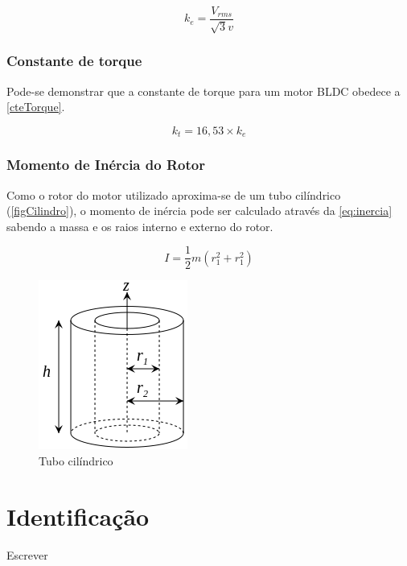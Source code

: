 \documentclass[
	12pt,				%
	openright,			%
	oneside,			%
	a4paper,			%
	english,			%
	french,				%
	spanish,			%
	brazil,				%
	]{abntex2}
\begin{document}
\begin{equation}
\label{cteTensao}
  k_e = \frac{V_{rms}}{\sqrt{3} v}
\end{equation}

\subsection{Constante de torque}

Pode-se demonstrar \cite{referenceBook} que a constante de torque para um motor BLDC obedece a \autoref{cteTorque}.

\begin{equation}
\label{cteTorque}
  k_t = 16,53 \times k_e
\end{equation}

\subsection{Momento de Inércia do Rotor}

Como o rotor do motor utilizado aproxima-se de um tubo cilíndrico (\autoref{figCilindro}), o momento de inércia pode ser calculado através da \autoref{eq:inercia} sabendo a massa e os raios interno e externo do rotor.

\begin{equation}
\label{eq:inercia}
  I = \frac{1}{2}m\left(r_1^2 + r_1^2\right)
\end{equation}

\begin{figure}[htb]
	\caption{\label{figCilindro}Tubo cilíndrico}
	\begin{center}
	  \includegraphics[scale=0.5]{figuras/figcilindro.png}
	\end{center}
\end{figure}

\chapter{Identificação}
Escrever
\end{document}
